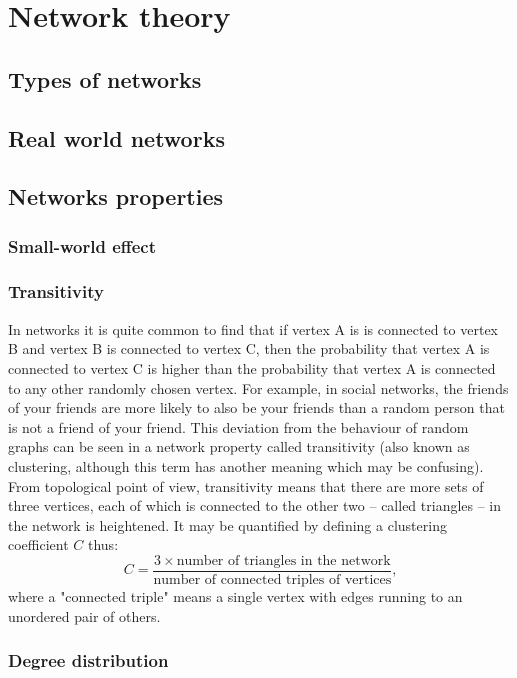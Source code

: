 \section{Network theory}

	\subsection{Types of networks}
		
	\subsection{Real world networks}
		
	\subsection{Networks properties}
		
		\subsubsection{Small-world effect}
			
		\subsubsection{Transitivity}
			In networks it is quite common to find that if vertex A is is connected to vertex B and vertex B is connected to vertex C, then the probability that vertex A is connected to vertex C is higher than the probability that vertex A is connected to any other randomly chosen vertex. For example, in social networks, the friends of your friends are more likely to also be your friends than a random person that is not a friend of your friend. This deviation from the behaviour of random graphs can be seen in a network property called transitivity (also known as clustering, although this term has another meaning which may be confusing). From topological point of view, transitivity means that there are more sets of three vertices, each of which is connected to the other two -- called triangles -- in the network is heightened. It may be quantified by defining a clustering coefficient $C$ thus:
			\[ C = \frac{3 \times \mbox{number of triangles in the network}}{\mbox{number of connected triples of vertices}} \mbox{,} \]
			where a "connected triple" means a single vertex with edges running to an unordered pair of others.
			
		\subsubsection{Degree distribution}
			
